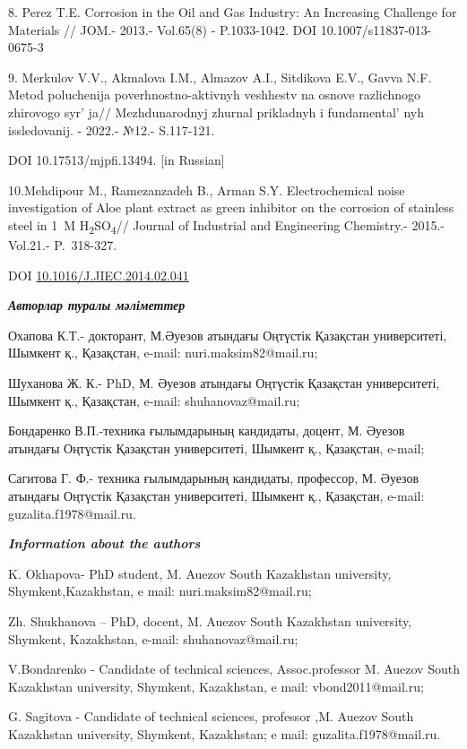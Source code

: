 8. Perez T.E. Corrosion in the Oil and Gas Industry: An Increasing
Challenge for Materials // JOM.- 2013.- Vol.65(8) - P.1033-1042. DOI
10.1007/s11837-013-0675-3

9. Merkulov V.V., Akmalova I.M., Almazov A.I., Sitdikova E.V., Gavva
N.F. Metod poluchenija poverhnostno-aktivnyh veshhestv na osnove
razlichnogo zhirovogo syr' ja// Mezhdunarodnyj zhurnal
prikladnyh i fundamental' nyh issledovanij. - 2022.-
№12.- S.117-121.

DOI 10.17513/mjpfi.13494. {[}in Russian{]}

10.Mehdipour M., Ramezanzadeh B., Arman S.Y. Electrochemical noise
investigation of Aloe plant extract as green inhibitor on the corrosion
of stainless steel in 1~M H\textsubscript{2}SO\textsubscript{4}//
Journal of Industrial and Engineering Chemistry.- 2015.-Vol.21.-
P.~318-327.

DOI
\href{https://doi.org/10.1016/J.JIEC.2014.02.041}{10.1016/J.JIEC.2014.02.041}

\emph{{\bfseries Авторлар туралы мәліметтер}}

Охапова К.Т.- докторант, М.Әуезов атындағы Оңтүстік Қазақстан
университеті, Шымкент қ., Қазақстан, e-mail: nuri.maksim82@mail.ru;

Шуханова Ж. К.- PhD, М. Әуезов атындағы Оңтүстік Қазақстан университеті,
Шымкент қ., Қазақстан, e-mail: shuhanovaz@mail.ru;

Бондаренко В.П.-техника ғылымдарының кандидаты, доцент, М. Әуезов
атындағы Оңтүстік Қазақстан университеті, Шымкент қ., Қазақстан, e-mail;

Сагитова Г. Ф.- техника ғылымдарының кандидаты, профессор, М. Әуезов
атындағы Оңтүстік Қазақстан университеті, Шымкент қ., Қазақстан, e-mail:
guzalita.f1978@mail.ru.

\emph{{\bfseries Information about the authors}}

K. Okhapova- PhD student, M. Auezov South Kazakhstan university,
Shymkent,Kazakhstan, e mail: nuri.maksim82@mail.ru;

Zh. Shukhanova -- PhD, docent, M. Auezov South Kazakhstan university,
Shymkent, Kazakhstan, e-mail: shuhanovaz@mail.ru;

V.Bondarenko - Candidate of technical sciences, Assoc.professor M.
Auezov South Kazakhstan university, Shymkent, Kazakhstan, e mail:
vbond2011@mail.ru;

G. Sagitova - Candidate of technical sciences, professor ,M. Auezov
South Kazakhstan university, Shymkent, Kazakhstan; e mail:
guzalita.f1978@mail.ru.